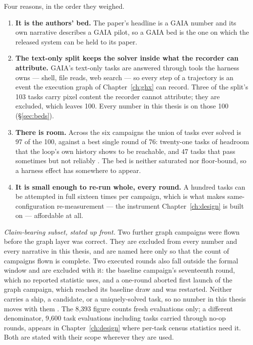 Four reasons, in the order they weighed.

\begin{enumerate}
  \item \textbf{It is the authors' bed.} The paper's headline is a GAIA
        number and its own narrative describes a GAIA pilot, so a GAIA bed
        is the one on which the released system can be held to its
        paper.
  \item \textbf{The text-only split keeps the solver inside what the
        recorder can attribute.} GAIA's text-only tasks are answered
        through tools the harness owns --- shell, file reads, web search
        --- so every step of a trajectory is an event the execution graph
        of Chapter~\ref{ch:ghx} can record. Three of the split's 103 tasks
        carry pixel content the recorder cannot attribute; they are
        excluded, which leaves 100. Every number in this thesis is on
        those 100 (\S\ref{sec:beds}).
  \item \textbf{There is room.} Across the six campaigns the union of
        tasks ever solved is 97 of the 100, against a best single round of
        76: twenty-one tasks of headroom that the loop's own history shows
        to be reachable, and 47 tasks that pass sometimes but not
        reliably . The bed is neither saturated nor floor-bound, so a
        harness effect has somewhere to appear.
  \item \textbf{It is small enough to re-run whole, every round.} A
        hundred tasks can be attempted in full sixteen times per campaign,
        which is what makes same-configuration re-measurement --- the
        instrument Chapter~\ref{ch:design} is built on --- affordable at
        all.
\end{enumerate}

\emph{Claim-bearing subset, stated up front.} Two further graph campaigns
were flown before the graph layer was correct. They are excluded from
every number and every narrative in this thesis, and are named here only
so that the count of campaigns flown is complete. Two executed rounds
also fall outside the formal window and are excluded with it: the baseline campaign's seventeenth
round, which no reported statistic uses, and a one-round aborted first
launch of the graph campaign,
which reached its baseline draw and was restarted. Neither carries a ship,
a candidate, or a uniquely-solved task, so no number in this thesis moves
with them . The 8{,}393 figure counts fresh
evaluations only; a different denominator, 9{,}600 task evaluations
including tasks carried through no-op rounds, appears in
Chapter~\ref{ch:design} where per-task census statistics need it. Both are
stated with their scope wherever they are used.

